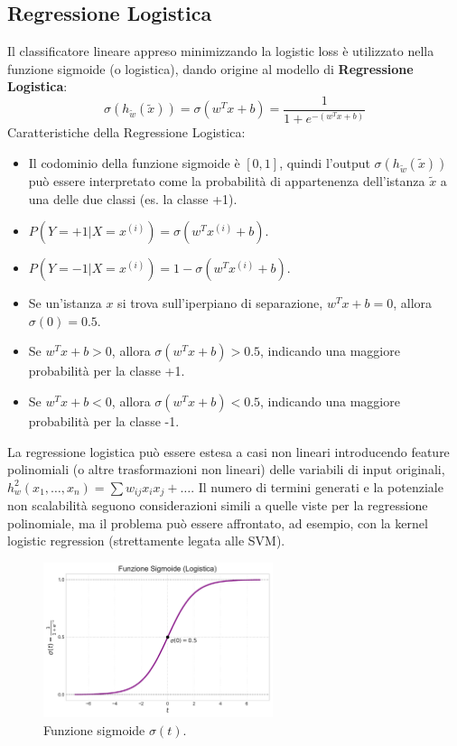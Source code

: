 \documentclass{article}
\begin{document}
\subsection{Regressione Logistica}
Il classificatore lineare appreso minimizzando la logistic loss è utilizzato nella funzione sigmoide (o logistica), dando origine al modello di \textbf{Regressione Logistica}:
$$ \sigma(h_{\tilde{w}}(\tilde{x})) = \sigma(w^T x + b) = \frac{1}{1 + e^{-(w^T x + b)}} $$
Caratteristiche della Regressione Logistica:
\begin{itemize}
    \item Il codominio della funzione sigmoide è $[0, 1]$, quindi l'output $\sigma(h_{\tilde{w}}(\tilde{x}))$ può essere interpretato come la probabilità di appartenenza dell'istanza $\tilde{x}$ a una delle due classi (es. la classe +1).
    \item $P(Y=+1 | X=x^{(i)}) = \sigma(w^T x^{(i)} + b)$.
    \item $P(Y=-1 | X=x^{(i)}) = 1 - \sigma(w^T x^{(i)} + b)$.
    \item Se un'istanza $x$ si trova sull'iperpiano di separazione, $w^T x + b = 0$, allora $\sigma(0) = 0.5$.
    \item Se $w^T x + b > 0$, allora $\sigma(w^T x + b) > 0.5$, indicando una maggiore probabilità per la classe +1.
    \item Se $w^T x + b < 0$, allora $\sigma(w^T x + b) < 0.5$, indicando una maggiore probabilità per la classe -1.
\end{itemize}
La regressione logistica può essere estesa a casi non lineari introducendo feature polinomiali (o altre trasformazioni non lineari) delle variabili di input originali, $h_w^2(x_1, \dots, x_n) = \sum w_{ij} x_i x_j + \dots$. Il numero di termini generati e la potenziale non scalabilità seguono considerazioni simili a quelle viste per la regressione polinomiale, ma il problema può essere affrontato, ad esempio, con la kernel logistic regression (strettamente legata alle SVM).

\begin{figure}[H]
    \centering
    \includegraphics[width=0.6\textwidth]{images/sigmoid_function.pdf}
    \caption{Funzione sigmoide $\sigma(t)$.}
    \label{fig:sigmoid_function}
\end{figure}
\end{document}

